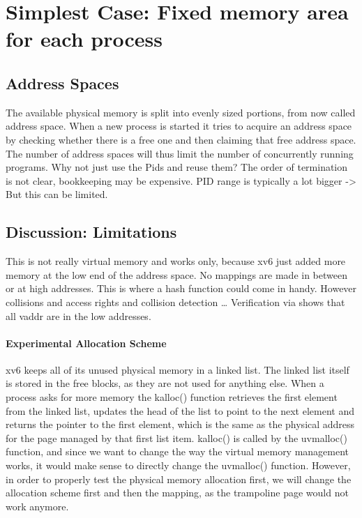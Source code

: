 
\section{Simplest Case: Fixed memory area for each process}
\subsection{Address Spaces}
The available physical memory is split into evenly sized portions, from now called address space.
When a new process is started it tries to acquire an address space by checking whether
there is a free one and then claiming that free address space.
The number of address spaces will thus limit the number of concurrently running programs.
Why not just use the Pids and reuse them? The order of termination is not clear, bookkeeping
may be expensive. PID range is typically a lot bigger -> But this can be limited.
\subsection{Discussion: Limitations}
This is not really virtual memory and works only, because xv6 just added more memory at the low
end of the address space. No mappings are made in between or at high addresses.
This is where a hash function could come in handy. However collisions and access rights and
collision detection \ldots
Verification via %
shows that all vaddr are in the low addresses.







\paragraph*{Experimental Allocation Scheme}
xv6 keeps all of its unused physical memory in a linked list. The linked list itself is stored
in the free blocks, as they are not used for anything else. When a process asks for more memory
the kalloc() function retrieves the first element from the linked list, updates the head
of the list to point to the next element and returns the pointer to the first element,
which is the same as the physical address for the page managed by that first list item.
kalloc() is called by the uvmalloc() function, and since we want to change the way
the virtual memory management works, it would make sense to directly change the uvmalloc() function.
However, in order to properly test the physical memory allocation first, we will change
the allocation scheme first and then the mapping, as the trampoline page would not work anymore.

